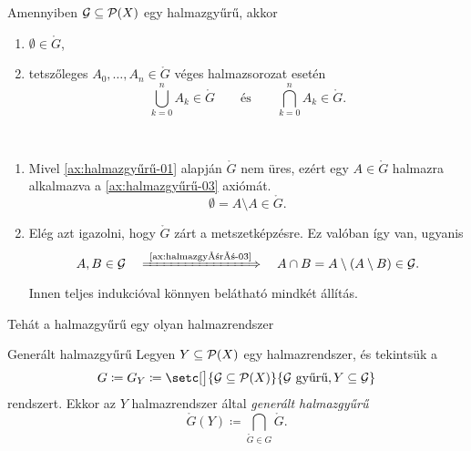 \documentclass[
]{elteikthesis}[2024/04/26]
\begin{document}
	\begin{stat*}
		Amennyiben \( \mathcal{G} \subseteq \mathcal{P}( X ) \) egy halmazgyűrű, akkor
		\begin{enumerate}
			\item
			\( \emptyset \in \ring{G} \),
			
			\item
			tetszőleges \( A_0, \dots, A_n \in \ring{G} \) véges halmazsorozat esetén
			\[
				\bigcup_{k=0}^{n} A_k \in \ring{G} \qquad \text{és} \qquad
				\bigcap_{k=0}^{n} A_k \in \ring{G}.
			\]
		\end{enumerate}
	\end{stat*}
	\begin{proof*}\,
		\begin{enumerate}
			\item Mivel \ref{ax:halmazgyűrű-01} alapján \( \ring{G} \) nem üres, 
			ezért egy \( A \in \ring{G} \) halmazra alkalmazva a \ref{ax:halmazgyűrű-03} axiómát.
			\[
				\emptyset = A \setminus A \in \ring{G}.
			\]
			
			\item Elég azt igazolni, hogy \( \ring{G} \) zárt a metszetképzésre.
			Ez valóban így van, ugyanis
			\[
				A, B \in \ring{G}
				\quad \xLongrightarrow{\ \text{\ref{ax:halmazgyűrű-03}} } \quad
				A \cap B = A \setminus (A \setminus B) \in \ring{G}.
			\]
			Innen teljes indukcióval könnyen belátható mindkét állítás.
		\end{enumerate}
	\end{proof*}
	
	Tehát a halmazgyűrű egy olyan halmazrendszer
	
	\begin{definition}{Generált halmazgyűrű}{}
		Legyen \( Y \subseteq \mathcal{P}( X ) \) egy halmazrendszer, és tekintsük a
		\[
			G \coloneq G_Y \coloneq 
			\setc[\big]{ \ring{G} \subseteq \powerset{X} }
			{ \ring{G} \text{ gyűrű}, Y \subseteq \ring{G} }
		\]
		rendszert. Ekkor az \( Y \) halmazrendszer által \emph{generált halmazgyűrű}
		\[
			\ring{G}(Y) \coloneq \bigcap_{\ring{G} \in G} \ring{G}.
		\]
	\end{definition}
\end{document}

